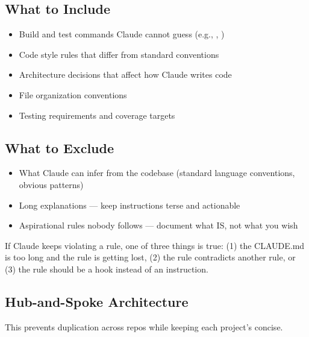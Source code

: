 \subsection{What to Include}

\begin{itemize}
  \item Build and test commands Claude cannot guess (e.g., , )
  \item Code style rules that differ from standard conventions
  \item Architecture decisions that affect how Claude writes code
  \item File organization conventions
  \item Testing requirements and coverage targets
\end{itemize}

\subsection{What to Exclude}

\begin{itemize}
  \item What Claude can infer from the codebase (standard language conventions, obvious patterns)
  \item Long explanations --- keep instructions terse and actionable
  \item Aspirational rules nobody follows --- document what IS, not what you wish
\end{itemize}

\begin{tipbox}
If Claude keeps violating a rule, one of three things is true:
(1) the CLAUDE.md is too long and the rule is getting lost,
(2) the rule contradicts another rule, or
(3) the rule should be a hook instead of an instruction.
\end{tipbox}

\subsection{Hub-and-Spoke Architecture}


This prevents duplication across repos while keeping each project's  concise.

